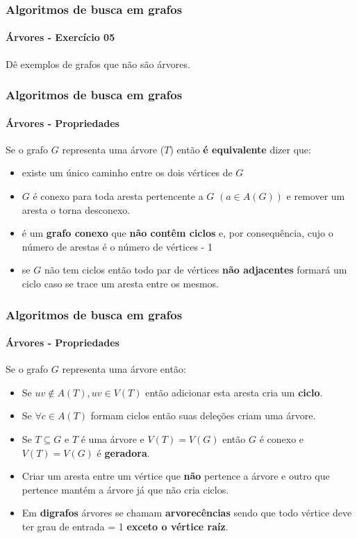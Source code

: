 \begin{frame}
	\frametitle{Algoritmos de busca em grafos}
	\framesubtitle{Árvores - Exercício 05}
	\par Dê exemplos de grafos que não são árvores.
\end{frame}

\begin{frame}
	\frametitle{Algoritmos de busca em grafos}
	\framesubtitle{Árvores - Propriedades}
	\par Se o grafo $G$ representa uma árvore ($T$) então \textbf{é equivalente} dizer que:
	\begin{itemize}
		\item existe um único caminho entre os dois vértices de $G$
		\item $G$ é conexo para toda aresta pertencente a $G$ $(a \in A(G))$ e remover um aresta o torna desconexo.
		\item é um \textbf{grafo conexo} que \textbf{não contêm ciclos} e, por consequência, cujo o número de arestas é o número de vértices - 1
		\item se $G$ não tem ciclos então todo par de vértices \textbf{não adjacentes} formará um ciclo caso se trace um aresta entre os mesmos.
	\end{itemize}
\end{frame}

\begin{frame}
	\frametitle{Algoritmos de busca em grafos}
	\framesubtitle{Árvores - Propriedades}
	\par Se o grafo $G$ representa uma árvore então:
	\begin{itemize}
		\item Se $uv \notin A(T), uv \in V(T)$ então adicionar esta aresta cria um \textbf{ciclo}.
		\item Se $\forall c \in A(T)$ formam ciclos então suas deleções criam uma árvore.
		\item Se $T \subseteq G$ e $T$ é uma árvore e $V(T) = V(G)$ então $G$ é conexo e $V(T) = V(G)$ é \textbf{geradora}.
		\item Criar um aresta entre um vértice que \textbf{não} pertence a árvore e outro que pertence mantém a árvore já que não cria ciclos.
		\item Em \textbf{digrafos} árvores se chamam \textbf{arvorecências} sendo que todo vértice deve ter grau de entrada = 1 \textbf{exceto o vértice raíz}.
	\end{itemize}
\end{frame}

